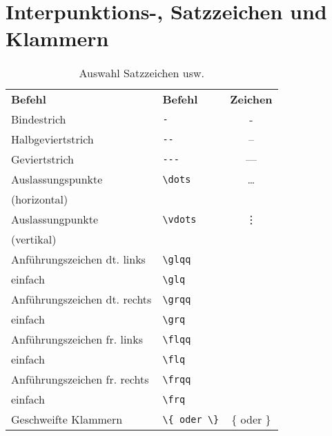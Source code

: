 \section{Interpunktions-, Satzzeichen und Klammern}
\setlength{\tabcolsep}{1cm}
\begin{table}[H]
\begin{tabular}{l l c}
\textbf{Befehl}				&\textbf{Befehl}		&\textbf{Zeichen}\\
Bindestrich				&\verb=-=			&-\\
Halbgeviertstrich			&\verb=--=			&--\\
Geviertstrich				&\verb=---=		&---\\
Auslassungspunkte			&\verb=\dots=		&\dots\\
(horizontal)\\
Auslassungpunkte			&\verb=\vdots=		&\vdots\\
(vertikal)\\
Anführungszeichen dt. links		&\verb=\glqq=		&\glqq\\
einfach					&\verb=\glq=		&\glq\\
Anführungszeichen dt. rechts	&\verb=\grqq=		&\grqq\\
einfach					&\verb=\grq=		&\grq\\
Anführungszeichen fr. links		&\verb=\flqq=		&\flqq\\
einfach					&\verb=\flq=		&\flq\\
Anführungszeichen fr. rechts	&\verb=\frqq=		&\frqq\\
einfach					&\verb=\frq=		&\frq\\
Geschweifte Klammern		&\verb=\{ oder \}=	&\{ oder \}
\end{tabular}
\caption{Auswahl Satzzeichen usw.}
\end{table}
